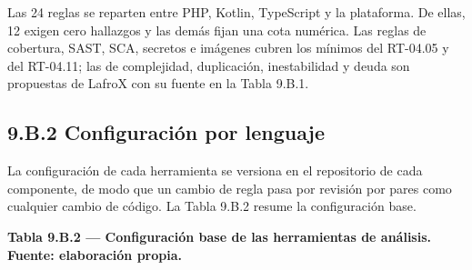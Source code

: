 Las 24 reglas se reparten entre PHP, Kotlin, TypeScript y la plataforma. De ellas, 12 exigen cero hallazgos y las demás fijan una cota numérica. Las reglas de cobertura, SAST, SCA, secretos e imágenes cubren los mínimos del RT-04.05 y del RT-04.11; las de complejidad, duplicación, inestabilidad y deuda son propuestas de LafroX con su fuente en la Tabla 9.B.1.

\subsection*{9.B.2 Configuración por lenguaje}

La configuración de cada herramienta se versiona en el repositorio de cada componente, de modo que un cambio de regla pasa por revisión por pares como cualquier cambio de código. La Tabla 9.B.2 resume la configuración base.

\textbf{Tabla 9.B.2 — Configuración base de las herramientas de análisis. Fuente: elaboración propia.}

